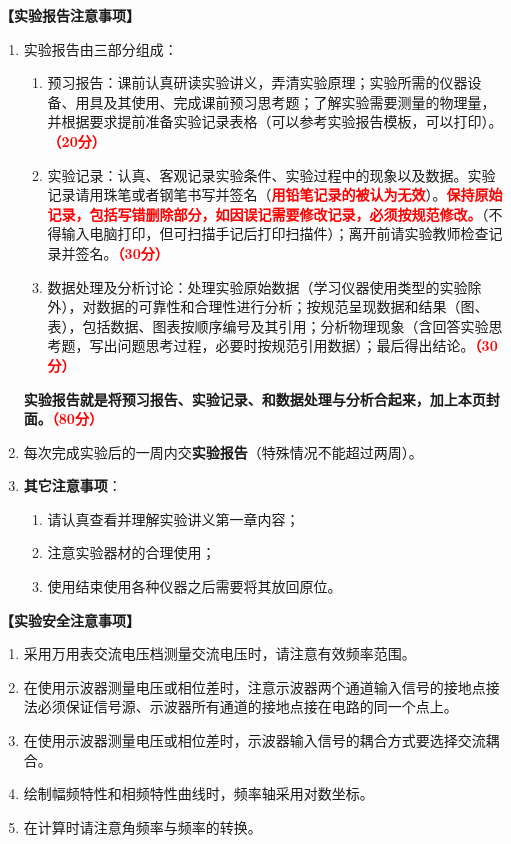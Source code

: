 \documentclass[dvipsnames, svgnames,a4paper,11pt]{article}
\begin{document}
	\textbf{【实验报告注意事项】}
	\begin{enumerate}
		\item 实验报告由三部分组成：
		\begin{enumerate}
			\item 预习报告：课前认真研读实验讲义，弄清实验原理；实验所需的仪器设备、用具及其使用、完成课前预习思考题；了解实验需要测量的物理量，并根据要求提前准备实验记录表格（可以参考实验报告模板，可以打印）。\textcolor{red}{\textbf{（20分）}}
			\item 实验记录：认真、客观记录实验条件、实验过程中的现象以及数据。实验记录请用珠笔或者钢笔书写并签名（\textcolor{red}{\textbf{用铅笔记录的被认为无效}}）。\textcolor{red}{\textbf{保持原始记录，包括写错删除部分，如因误记需要修改记录，必须按规范修改。}}（不得输入电脑打印，但可扫描手记后打印扫描件）；离开前请实验教师检查记录并签名。\textcolor{red}{\textbf{（30分）}}
			\item 数据处理及分析讨论：处理实验原始数据（学习仪器使用类型的实验除外），对数据的可靠性和合理性进行分析；按规范呈现数据和结果（图、表），包括数据、图表按顺序编号及其引用；分析物理现象（含回答实验思考题，写出问题思考过程，必要时按规范引用数据）；最后得出结论。\textcolor{red}{\textbf{（30分）}}
		\end{enumerate}
		\textbf{实验报告就是将预习报告、实验记录、和数据处理与分析合起来，加上本页封面。\textcolor{red}{（80分）}}
		\item 每次完成实验后的一周内交\textbf{实验报告}（特殊情况不能超过两周）。
		\item \textbf{其它注意事项}：
		\begin{enumerate}
			\item 请认真查看并理解实验讲义第一章内容；
			\item 注意实验器材的合理使用；
			\item 使用结束使用各种仪器之后需要将其放回原位。
		\end{enumerate}
	\end{enumerate}
	
	\textbf{【实验安全注意事项】}	
	\begin{enumerate}
		\item 采用万用表交流电压档测量交流电压时，请注意有效频率范围。
		\item 在使用示波器测量电压或相位差时，注意示波器两个通道输入信号的接地点接法必须保证信号源、示波器所有通道的接地点接在电路的同一个点上。
		\item 在使用示波器测量电压或相位差时，示波器输入信号的耦合方式要选择交流耦合。
		\item 绘制幅频特性和相频特性曲线时，频率轴采用对数坐标。
		\item 在计算时请注意角频率与频率的转换。
		
	\end{enumerate}
	
\end{document}
